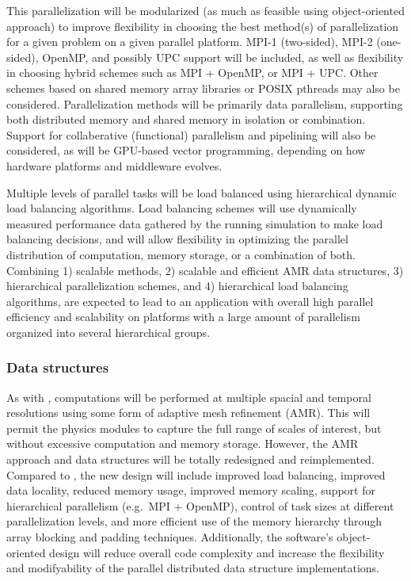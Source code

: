 \documentclass[11pt]{article}
\begin{document}
    This parallelization will be modularized (as much as feasible
    using object-oriented approach) to improve flexibility in choosing
    the best method(s) of parallelization for a given problem on a
    given parallel platform.  MPI-1 (two-sided), MPI-2 (one-sided),
    OpenMP, and possibly UPC support will be included, as well as
    flexibility in choosing hybrid schemes such as MPI + OpenMP, or
    MPI + UPC.  Other schemes based on shared memory array libraries
    or POSIX pthreads may also be considered.  Parallelization methods
    will be primarily data parallelism, supporting both distributed
    memory and shared memory in isolation or combination.  Support for
    collaberative (functional) parallelism and pipelining will also be
    considered, as will be GPU-based vector programming, depending
    on how hardware platforms and middleware evolves.


    Multiple levels of parallel tasks will be load balanced using
    hierarchical dynamic load balancing algorithms.  Load balancing
    schemes will use dynamically measured performance data gathered by
    the running simulation to make load balancing decisions, and will
    allow flexibility in optimizing the parallel distribution of
    computation, memory storage, or a combination of both.  Combining
    1) scalable methods, 2) scalable and efficient AMR data
    structures, 3) hierarchical parallelization schemes, and 4)
    hierarchical load balancing algorithms, are expected to lead to an
    application with overall high parallel efficiency and scalability
    on platforms with a large amount of parallelism organized into
    several hierarchical groups.


    \subsubsection{Data structures}

    As with \enzo, computations will be performed at multiple spacial
    and temporal resolutions using some form of adaptive mesh
    refinement (AMR).  This will permit the physics modules to capture
    the full range of scales of interest, but without excessive
    computation and memory storage.  However, the AMR approach and
    data structures will be totally redesigned and reimplemented.
    Compared to \enzo, the new design will include improved load
    balancing, improved data locality, reduced memory usage, improved
    memory scaling, support for hierarchical parallelism (e.g.~MPI +
    OpenMP), control of task sizes at different parallelization
    levels, and more efficient use of the memory hierarchy through
    array blocking and padding techniques.  Additionally, the
    software's object-oriented design will reduce overall code
    complexity and increase the flexibility and modifyability of the
    parallel distributed data structure implementations.
\end{document}
